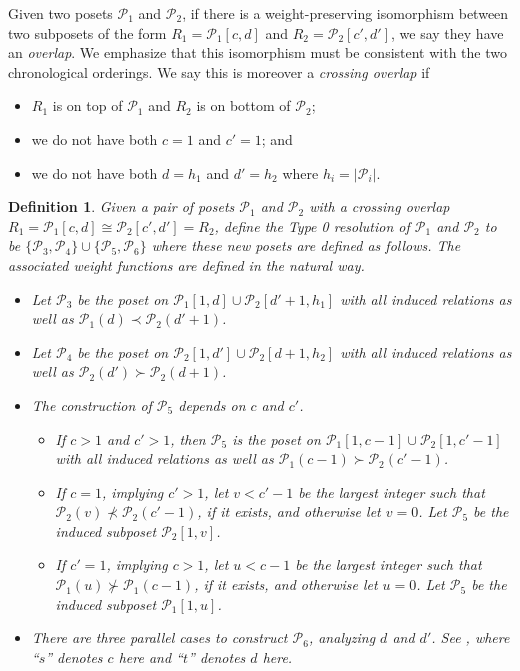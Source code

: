 \documentclass[12pt, letterpaper,table]{amsart}
\newtheorem{definition}[theorem]{Definition}
\theoremstyle{remark}
\newcommand{\calP}{\mathcal{P}}
\begin{document}
Given two posets $\calP_1$ and $\calP_2$, if there is a weight-preserving isomorphism between two subposets of the form $R_1 = \calP_1[c,d]$ and $R_2 = \calP_2[c',d']$, we say they have an \emph{overlap}. We emphasize that this isomorphism must be consistent with the two chronological orderings.  We say this is moreover a \emph{crossing overlap} if \begin{itemize}
    \item $R_1$ is on top of $\calP_1$ and $R_2$ is on bottom of $\calP_2$; 
    \item we do not have both $c = 1$ and $c' = 1$; and 
    \item we do not have both $d = h_1$ and $d' = h_2$ where $h_i = \vert \calP_i \vert$.
\end{itemize}


\begin{definition}\label{def:Type0Resolve}
Given a pair of posets $\calP_1$ and $\calP_2$ with a crossing overlap $R_1 = \calP_1[c,d] \cong \calP_2[c',d'] = R_2$, define the \emph{Type 0 resolution} of $\calP_1$ and $\calP_2$ to be $\{\calP_3, \calP_4\} \cup \{\calP_5, \calP_6\}$ where these new posets are defined as follows. The associated weight functions are defined in the natural way.
\begin{itemize}
    \item Let $\calP_3$  be the poset on $\calP_1[1,d] \cup \calP_2[d'+1,h_1]$ with all induced relations as well as $\calP_1(d)\prec \calP_2(d'+1)$.
    \item Let $\calP_4$  be the poset on $\calP_2[1,d'] \cup \calP_2[d+1,h_2]$ with all induced relations as well as $\calP_2(d')\succ\calP_2(d+1)$.
    \item The construction of $\calP_5$ depends on $c$ and $c'$.
    \begin{itemize}
        \item If $c>1$ and $c'>1$, then $\calP_5$ is the poset on $\calP_1[1,c-1] \cup \calP_2[1,c'-1]$ with all induced relations as well as $\calP_1(c-1) \succ \calP_2(c'-1)$.
        \item If $c = 1$, implying $c' > 1$, let $v<c'-1$ be the largest integer such that $\calP_2(v) \not\prec \calP_2(c'-1)$, if it exists,  and otherwise let $v = 0$. Let $\calP_5 $  be the induced subposet $\calP_2[1,v]$.
        \item If $c' = 1$, implying $c > 1$, let $u<c-1$ be the largest integer such that $\calP_1(u) \not\succ \calP_1(c-1)$, if it exists,  and otherwise let $u = 0$. Let $\calP_5 $  be the induced subposet $\calP_1[1,u]$. 
    \end{itemize}
    \item There are three parallel cases to construct $\calP_6$, analyzing $d$ and $d'$. See \cite[Definition 8.2]{BG}, where ``$s$'' denotes $c$ here and ``$t$'' denotes $d$ here.
\end{itemize}
\end{definition}
\end{document}
